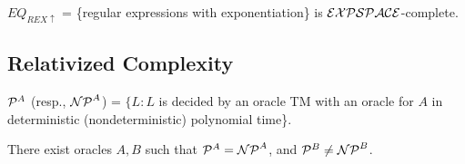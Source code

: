 \begin{theorem}
$EQ_{REX\uparrow}$ = \{regular expressions with exponentiation\} is $\mathcal{EXPSPACE}$-complete.
\end{theorem}

\subsection{Relativized Complexity}

\begin{definition}
$\mathcal{P}^A$ (resp., $\mathcal{NP}^A$) = $\{L : L$ is decided by an oracle TM with an oracle for $A$ in deterministic (nondeterministic) polynomial time\}.
\end{definition}

\begin{theorem}
There exist oracles $A, B$ such that $\mathcal{P}^A = \mathcal{NP}^A$, and $\mathcal{P}^B \ne \mathcal{NP}^B$.
\end{theorem}